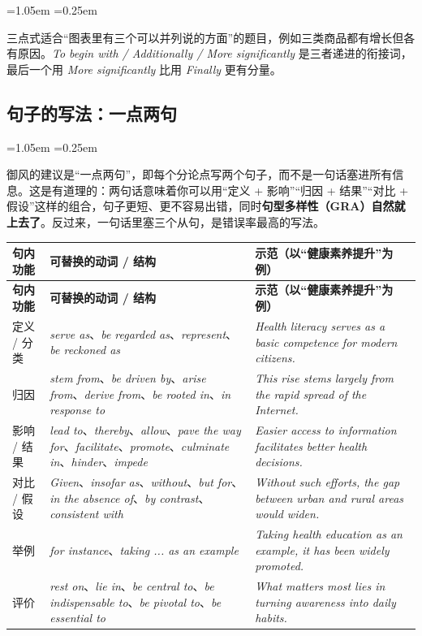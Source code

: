 \documentclass[11pt,a4paper]{ctexart}
\newcommand{\en}[1]{\textit{#1}}
\newenvironment{note}{%
  \par\addvspace{5pt}%
  \begin{list}{}{\leftmargin=1.05em \rightmargin=0.25em \listparindent=0pt
    \itemindent=0pt \topsep=0pt \parsep=2pt \itemsep=2pt \partopsep=0pt}%
  \item\relax\small\color{ink}%
}{%
  \end{list}\addvspace{5pt}%
}
\begin{document}
\begin{note}
三点式适合“图表里有三个可以并列说的方面”的题目，例如三类商品都有增长但各有原因。\en{To begin with / Additionally / More significantly} 是三者递进的衔接词，最后一个用 \en{More significantly} 比用 \en{Finally} 更有分量。
\end{note}

\subsection{句子的写法：一点两句}

\begin{note}
御风的建议是“一点两句”，即每个分论点写两个句子，而不是一句话塞进所有信息。这是有道理的：两句话意味着你可以用“定义 + 影响”“归因 + 结果”“对比 + 假设”这样的组合，句子更短、更不容易出错，同时\textbf{句型多样性（GRA）自然就上去了}。反过来，一句话里塞三个从句，是错误率最高的写法。
\end{note}

\begin{longtable}{L{2.6cm} L{5.6cm} L{6.0cm}}
\toprule
\textbf{句内功能} & \textbf{可替换的动词 / 结构} & \textbf{示范（以“健康素养提升”为例）}\\
\midrule
\endfirsthead
\toprule
\textbf{句内功能} & \textbf{可替换的动词 / 结构} & \textbf{示范（以“健康素养提升”为例）}\\
\midrule
\endhead
定义 / 分类 & \en{serve as}、\en{be regarded as}、\en{represent}、\en{be reckoned as} & \en{Health literacy serves as a basic competence for modern citizens.}\\
\midrule
归因 & \en{stem from}、\en{be driven by}、\en{arise from}、\en{derive from}、\en{be rooted in}、\en{in response to} & \en{This rise stems largely from the rapid spread of the Internet.}\\
\midrule
影响 / 结果 & \en{lead to}、\en{thereby}、\en{allow}、\en{pave the way for}、\en{facilitate}、\en{promote}、\en{culminate in}、\en{hinder}、\en{impede} & \en{Easier access to information facilitates better health decisions.}\\
\midrule
对比 / 假设 & \en{Given}、\en{insofar as}、\en{without}、\en{but for}、\en{in the absence of}、\en{by contrast}、\en{consistent with} & \en{Without such efforts, the gap between urban and rural areas would widen.}\\
\midrule
举例 & \en{for instance}、\en{taking ... as an example} & \en{Taking health education as an example, it has been widely promoted.}\\
\midrule
评价 & \en{rest on}、\en{lie in}、\en{be central to}、\en{be indispensable to}、\en{be pivotal to}、\en{be essential to} & \en{What matters most lies in turning awareness into daily habits.}\\
\bottomrule
\end{longtable}
\end{document}
